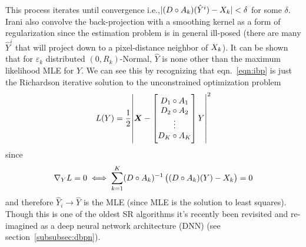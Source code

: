 %
This process iterates until convergence i.e.,\(\lvert (D \circ A_k)(\hat{Y}^i) - X_k \rvert < \delta\) for some \(\delta\).
%
Irani \etal\cite{Irani1991ImprovingRB} also convolve the back-projection with a smoothing kernel as a form of regularization since the estimation problem is in general ill-posed (there are many \(\hat{Y}^{i}\) that will project down to a pixel-distance neighbor of \(X_k\)).
%
It can be shown\cite{Elad1996} that for \(\varepsilon_k\) distributed \((0, R_k)\)-Normal, \(\hat{Y}\) is none other than the maximum likelihood MLE for \(Y\).
%
We can see this by recognizing that eqn.~\eqref{eqn:ibp} is just the Richardson iterative\cite{Anderssen:1972:RNM:891962} solution to the unconstrained optimization problem
\begin{equation}
    L(Y) = \frac{1}{2} \abs{ \bm{X} -  \begin{bmatrix}
                                           D_1 \circ A_1 \\
                                           D_2 \circ A_2 \\
                                           \vdots        \\
                                           D_K \circ A_K \\
    \end{bmatrix}  Y  }^2
    \label{eqn:l2regression}
\end{equation}
since
\begin{equation*}
    \nabla_{Y} L = 0
    \iff
    \sum_{k=1}^K (D \circ A_k)^{-1}\left( (D \circ A_k)(Y) - X_k \right) = 0
\end{equation*}
and therefore \(\hat{Y}_i \rightarrow \hat{Y}\) is the MLE (since MLE is the solution to least squares\cite{CaseBerg:01}).
%
Though this is one of the oldest SR algorithms it's recently been revisited and re-imagined as a deep neural network architecture (DNN)\cite{DBLP:journals.corr.abs-1803-02735} (see section~\ref{subsubsec:dbpn}).
